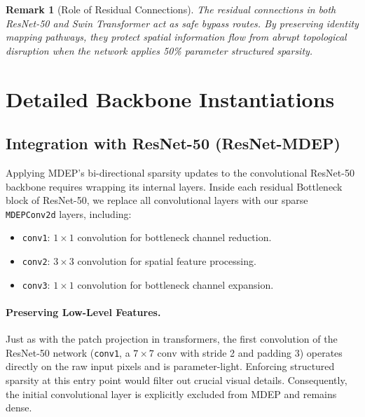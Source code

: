 \documentclass[letterpaper]{article} %
\newtheorem{remark}{Remark}
\begin{document}
\begin{remark}[Role of Residual Connections]
The residual connections in both ResNet-50 and Swin Transformer act as safe bypass routes. By preserving identity mapping pathways, they protect spatial information flow from abrupt topological disruption when the network applies 50\% parameter structured sparsity.
\end{remark}


\section{Detailed Backbone Instantiations}
\subsection{Integration with ResNet-50 (ResNet-MDEP)}\label{subsec:resnet}

Applying MDEP's bi-directional sparsity updates to the convolutional ResNet-50 backbone requires wrapping its internal layers. Inside each residual Bottleneck block of ResNet-50, we replace all convolutional layers with our sparse \texttt{MDEPConv2d} layers, including:
\begin{itemize}
    \item \texttt{conv1}: $1 \times 1$ convolution for bottleneck channel reduction.
    \item \texttt{conv2}: $3 \times 3$ convolution for spatial feature processing.
    \item \texttt{conv3}: $1 \times 1$ convolution for bottleneck channel expansion.
\end{itemize}

\paragraph{Preserving Low-Level Features.}
Just as with the patch projection in transformers, the first convolution of the ResNet-50 network (\texttt{conv1}, a $7 \times 7$ conv with stride 2 and padding 3) operates directly on the raw input pixels and is parameter-light. Enforcing structured sparsity at this entry point would filter out crucial visual details. Consequently, the initial convolutional layer is explicitly excluded from MDEP and remains dense.
\end{document}
